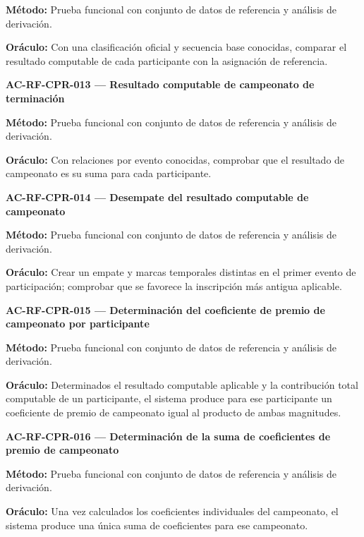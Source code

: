 \documentclass[10pt,letterpaper]{article}
\begin{document}
\textbf{Método:} Prueba funcional con conjunto de datos de referencia y análisis de derivación.\par
\textbf{Oráculo:} Con una clasificación oficial y secuencia base conocidas, comparar el resultado computable de cada participante con la asignación de referencia.\par\vspace{0.45em}
\noindent\textbf{AC-RF-CPR-013 --- Resultado computable de campeonato de terminación}\par
\textbf{Método:} Prueba funcional con conjunto de datos de referencia y análisis de derivación.\par
\textbf{Oráculo:} Con relaciones por evento conocidas, comprobar que el resultado de campeonato es su suma para cada participante.\par\vspace{0.45em}
\noindent\textbf{AC-RF-CPR-014 --- Desempate del resultado computable de campeonato}\par
\textbf{Método:} Prueba funcional con conjunto de datos de referencia y análisis de derivación.\par
\textbf{Oráculo:} Crear un empate y marcas temporales distintas en el primer evento de participación; comprobar que se favorece la inscripción más antigua aplicable.\par\vspace{0.45em}
\noindent\textbf{AC-RF-CPR-015 --- Determinación del coeficiente de premio de campeonato por participante}\par
\textbf{Método:} Prueba funcional con conjunto de datos de referencia y análisis de derivación.\par
\textbf{Oráculo:} Determinados el resultado computable aplicable y la contribución total computable de un participante, el sistema produce para ese participante un coeficiente de premio de campeonato igual al producto de ambas magnitudes.\par\vspace{0.45em}
\noindent\textbf{AC-RF-CPR-016 --- Determinación de la suma de coeficientes de premio de campeonato}\par
\textbf{Método:} Prueba funcional con conjunto de datos de referencia y análisis de derivación.\par
\textbf{Oráculo:} Una vez calculados los coeficientes individuales del campeonato, el sistema produce una única suma de coeficientes para ese campeonato.\par\vspace{0.45em}
\end{document}
